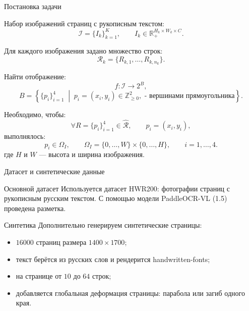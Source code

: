 \documentclass[12pt,pdf,hyperref={unicode}]{beamer}
\begin{document}
\begin{frame}{Постановка задачи}

\small

Набор изображений страниц с рукописным текстом:
\[
\mathcal{I}=\{I_k\}_{k=1}^K,
\qquad
I_k\in\mathbb{R}_+^{H_k\times W_k\times C}.
\]

Для каждого изображения задано множество строк:
\[
\mathcal{R}_k=\{R_{k,1},\dots,R_{k,n_k}\}.
\]

\vspace{1mm}
Найти отображение:
    \[
        f \colon \mathcal{I} \to 2^{B},
    \]
    \[
    B =
    \left\{
    \{p_i\}_{i=1}^{4}
    \;\middle|\;
    p_i=(x_i,y_i)\in \mathbb{Z}_{\ge 0}^{2},
    \text{ - вершинами прямоугольника}
    \right\}.
    \]

Необходимо, чтобы:
    \[
        \forall  R = \{p_i\}_{i=1}^{4} \in \hat{\mathcal{R}},
        \qquad p_i=(x_i,y_i),
    \]
    выполнялось: %
    \[
        p_i \in \Omega_I,
        \qquad
        \Omega_I = \{0,\dots,W\}\times\{0,\dots,H\},
        \qquad i=1,\dots,4.
    \]
    где $H$ и $W$ — высота и ширина изображения.

\end{frame}
\begin{frame}{Датасет и синтетические данные}

\small

\begin{block}{Основной датасет}
Используется датасет HWR200: фотографии страниц с рукописным русским текстом. С помощью модели PaddleOCR-VL (1.5)
проведена разметка.
\end{block}

\vspace{1mm}

\begin{block}{Синтетика}
Дополнительно генерируем синтетические страницы:
\begin{itemize}
    \item $16000$ страниц размера $1400 \times 1700$;
    \item текст берётся из русских слов и рендерится handwritten-fonts;
    \item на странице от $10$ до $64$ строк;
    \item добавляется глобальная деформация страницы:
    парабола или загиб одного края.
\end{itemize}
\end{block}

\let\thefootnote\relax
{}

\end{frame}
\end{document}
